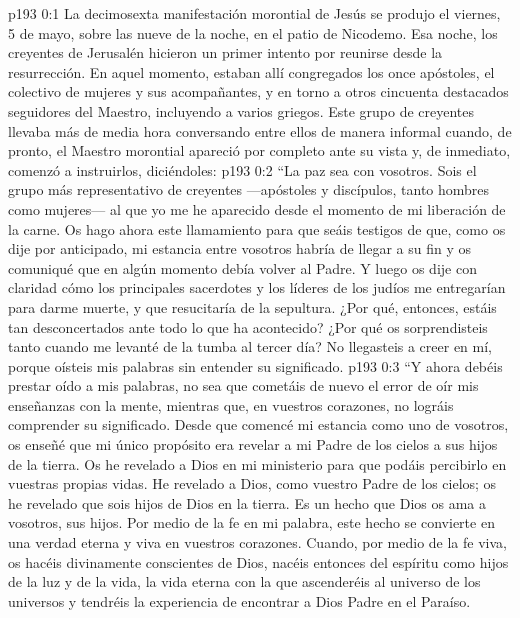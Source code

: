 \author{Comisión de seres intermedios}
\vs p193 0:1 La decimosexta manifestación morontial de Jesús se produjo el viernes, 5 de mayo, sobre las nueve de la noche, en el patio de Nicodemo. Esa noche, los creyentes de Jerusalén hicieron un primer intento por reunirse desde la resurrección. En aquel momento, estaban allí congregados los once apóstoles, el colectivo de mujeres y sus acompañantes, y en torno a otros cincuenta destacados seguidores del Maestro, incluyendo a varios griegos. Este grupo de creyentes llevaba más de media hora conversando entre ellos de manera informal cuando, de pronto, el Maestro morontial apareció por completo ante su vista y, de inmediato, comenzó a instruirlos, diciéndoles:
\vs p193 0:2 \pc “La paz sea con vosotros. Sois el grupo más representativo de creyentes ---apóstoles y discípulos, tanto hombres como mujeres--- al que yo me he aparecido desde el momento de mi liberación de la carne. Os hago ahora este llamamiento para que seáis testigos de que, como os dije por anticipado, mi estancia entre vosotros habría de llegar a su fin y os comuniqué que en algún momento debía volver al Padre. Y luego os dije con claridad cómo los principales sacerdotes y los líderes de los judíos me entregarían para darme muerte, y que resucitaría de la sepultura. ¿Por qué, entonces, estáis tan desconcertados ante todo lo que ha acontecido? ¿Por qué os sorprendisteis tanto cuando me levanté de la tumba al tercer día? No llegasteis a creer en mí, porque oísteis mis palabras sin entender su significado.
\vs p193 0:3 “Y ahora debéis prestar oído a mis palabras, no sea que cometáis de nuevo el error de oír mis enseñanzas con la mente, mientras que, en vuestros corazones, no lográis comprender su significado. Desde que comencé mi estancia como uno de vosotros, os enseñé que mi único propósito era revelar a mi Padre de los cielos a sus hijos de la tierra. Os he revelado a Dios en mi ministerio para que podáis percibirlo en vuestras propias vidas. He revelado a Dios, como vuestro Padre de los cielos; os he revelado que sois hijos de Dios en la tierra. Es un hecho que Dios os ama a vosotros, sus hijos. Por medio de la fe en mi palabra, este hecho se convierte en una verdad eterna y viva en vuestros corazones. Cuando, por medio de la fe viva, os hacéis divinamente conscientes de Dios, nacéis entonces del espíritu como hijos de la luz y de la vida, la vida eterna con la que ascenderéis al universo de los universos y tendréis la experiencia de encontrar a Dios Padre en el Paraíso.
